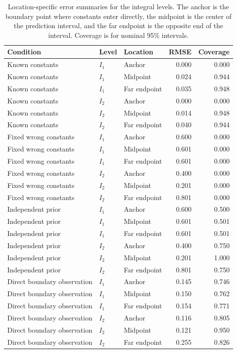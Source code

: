 \documentclass[11pt,a4paper]{article}
\theoremstyle{definition}
\theoremstyle{remark}
\begin{document}
\begin{table}[htbp]
\centering
\caption{\label{tab:boundary-constant-location-summary}Location-specific error summaries for the integral levels. The anchor is the boundary point where constants enter directly, the midpoint is the center of the prediction interval, and the far endpoint is the opposite end of the interval. Coverage is for nominal 95\% intervals.}
\begin{tabular}{lllrr}
Condition & Level & Location & RMSE & Coverage \\
\midrule
Known constants & \(I_1\) & Anchor & 0.000 & 0.000 \\
Known constants & \(I_1\) & Midpoint & 0.024 & 0.944 \\
Known constants & \(I_1\) & Far endpoint & 0.035 & 0.948 \\
Known constants & \(I_2\) & Anchor & 0.000 & 0.000 \\
Known constants & \(I_2\) & Midpoint & 0.014 & 0.948 \\
Known constants & \(I_2\) & Far endpoint & 0.040 & 0.944 \\
Fixed wrong constants & \(I_1\) & Anchor & 0.600 & 0.000 \\
Fixed wrong constants & \(I_1\) & Midpoint & 0.601 & 0.000 \\
Fixed wrong constants & \(I_1\) & Far endpoint & 0.601 & 0.000 \\
Fixed wrong constants & \(I_2\) & Anchor & 0.400 & 0.000 \\
Fixed wrong constants & \(I_2\) & Midpoint & 0.201 & 0.000 \\
Fixed wrong constants & \(I_2\) & Far endpoint & 0.801 & 0.000 \\
Independent prior & \(I_1\) & Anchor & 0.600 & 0.500 \\
Independent prior & \(I_1\) & Midpoint & 0.601 & 0.501 \\
Independent prior & \(I_1\) & Far endpoint & 0.601 & 0.501 \\
Independent prior & \(I_2\) & Anchor & 0.400 & 0.750 \\
Independent prior & \(I_2\) & Midpoint & 0.201 & 1.000 \\
Independent prior & \(I_2\) & Far endpoint & 0.801 & 0.750 \\
Direct boundary observation & \(I_1\) & Anchor & 0.145 & 0.746 \\
Direct boundary observation & \(I_1\) & Midpoint & 0.150 & 0.762 \\
Direct boundary observation & \(I_1\) & Far endpoint & 0.154 & 0.771 \\
Direct boundary observation & \(I_2\) & Anchor & 0.116 & 0.805 \\
Direct boundary observation & \(I_2\) & Midpoint & 0.121 & 0.950 \\
Direct boundary observation & \(I_2\) & Far endpoint & 0.255 & 0.826 \\
\end{tabular}

\end{table}
\end{document}
